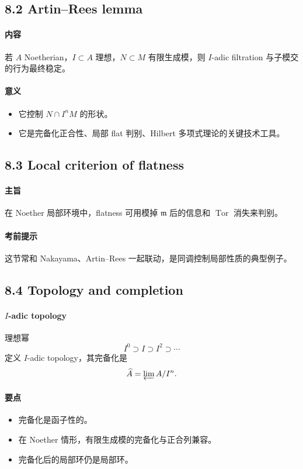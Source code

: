 \documentclass[a4paper]{ctexart}
\begin{document}
\subsection{8.2 Artin--Rees lemma}

\paragraph{内容}
若 \(A\) Noetherian，\(I\subset A\) 理想，\(N\subset M\) 有限生成模，则 \(I\)-adic filtration 与子模交的行为最终稳定。

\paragraph{意义}
\begin{itemize}
  \item 它控制 \(N\cap I^nM\) 的形状。
  \item 它是完备化正合性、局部 flat 判别、Hilbert 多项式理论的关键技术工具。
\end{itemize}

\subsection{8.3 Local criterion of flatness}

\paragraph{主旨}
在 Noether 局部环境中，flatness 可用模掉 \(\mathfrak m\) 后的信息和 \(\operatorname{Tor}\) 消失来判别。

\paragraph{考前提示}
这节常和 Nakayama、Artin--Rees 一起联动，是同调控制局部性质的典型例子。

\subsection{8.4 Topology and completion}

\paragraph{\(I\)-adic topology}
理想幂
\[
I^0\supset I\supset I^2\supset \cdots
\]
定义 \(I\)-adic topology，其完备化是
\[
\widehat A=\varprojlim A/I^n.
\]

\paragraph{要点}
\begin{itemize}
  \item 完备化是函子性的。
  \item 在 Noether 情形，有限生成模的完备化与正合列兼容。
  \item 完备化后的局部环仍是局部环。
\end{itemize}
\end{document}
